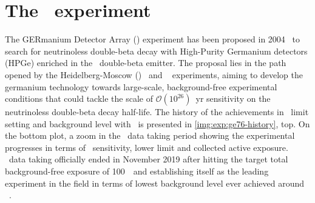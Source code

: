 
\chapter{The \gerda\ experiment}\label{chap:gerda}

The GERmanium Detector Array (\gerda) experiment has been proposed in
2004~\cite{gerda-proposal} to search for neutrinoless double-beta decay with High-Purity
Germanium detectors (HPGe) enriched in the \gesix\ double-beta emitter. The proposal lies
in the path opened by the Heidelberg-Moscow (\hdm)~\cite{Klapdor2001} and
\igex~\cite{Aalseth2002} experiments, aiming to develop the germanium technology towards
large-scale, background-free experimental conditions that could tackle the scale of
$\mathcal{O}(10^{26})$~yr sensitivity on the neutrinoless double-beta decay half-life. The
history of the achievements in \thalfzero\ limit setting and background level with \gesix\
is presented in \cref{img:exp:ge76-history}, top. On the bottom plot, a zoom in the
\gerda\ data taking period showing the experimental progresses in terms of \thalfzero\
sensitivity, lower limit and collected active exposure.  \gerda\ data taking officially
ended in November 2019 after hitting the target total background-free exposure of 100~\kgyr\ and
establishing itself as the leading experiment in the field in terms of lowest background
level ever achieved around \qbb~\cite{Agostini2019a}.

